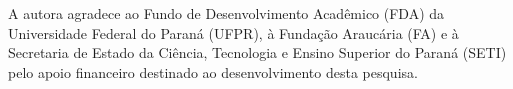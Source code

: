 \documentclass[portuguese]{textolivre}
\begin{document}
\printbibliography\label{sec-bib}

\begin{funding}
A autora agradece ao Fundo de Desenvolvimento Acadêmico (FDA) da Universidade Federal do Paraná (UFPR), à Fundação Araucária (FA) e à Secretaria de Estado da Ciência, Tecnologia e Ensino Superior do Paraná (SETI) pelo apoio financeiro destinado ao desenvolvimento desta pesquisa.
\end{funding}

\begin{dataavailability}
\end{dataavailability}
\end{document}
